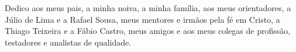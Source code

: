 
\renewcommand{\dedicatorianame}{DEDICATÓRIA}

\begin{dedicatoria}

Dedico aos meus pais, a minha noiva, a minha família, aos meus orientadores, a Júlio de Lima e a Rafael Sousa, meus mentores e irmãos pela fé em Cristo, a Thiago Teixeira e a Fábio Castro, meus amigos e aos meus colegas de profissão, testadores e analistas de qualidade.


\end{dedicatoria}
